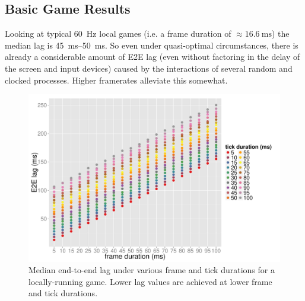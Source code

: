 \subsection{Basic Game Results}


Looking at typical \SI{60}{\hertz} local games (i.e. a frame duration of $\approx \SI{16.6}{\milli\second}$) the median lag is \SIrange{45}{50}{\milli\second}. So even under quasi-optimal circumstances, there is already a considerable amount of \gls{E2E} lag (even without factoring in the delay of the screen and input devices) caused by the interactions of several random and clocked processes. Higher framerates alleviate this somewhat.


\begin{figure}[!t]
	\centering
	\includegraphics[width=1.0\columnwidth]{../../../simulation/visualization/nwless-onlinegame-1000rounds.pdf}
	\caption{Median end-to-end lag under various frame and tick durations for a locally-running game. Lower lag values are achieved at lower frame and tick durations.}
\label{fig:nwless-scatter}
\end{figure}

